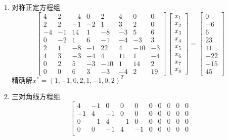 \documentclass[a4paper,11pt]{article}
\begin{document}
\begin{enumerate}
\begin{displaymath}
\begin{array}{c}
		\end{array}
		\right]
	\end{displaymath}
	精确解$x^{*}=\left(1,-1,0,1,2,0,3,1,-1,2\right)^T$
	\item 对称正定方程组
	\begin{displaymath} %
		\left[
		\begin{array}{cccccccc}
			4 & 2 & -4 & 0 & 2 & 4 & 0 & 0\\
    		2 & 2 & -1 & -2 & 1 & 3 & 2 & 0\\
		    -4 & -1 & 14 & 1 & -8 & -3 & 5 & 6\\
		    0 & -2 & 1 & 6 & -1 & -4 & -3 & 3\\
		    2 & 1 & -8 & -1 & 22 & 4 & -10 & -3\\
		    4 & 3 & -3 & -4 & 4 & 11 & 1 & -4\\
		    0 & 2 & 5 & -3 & -10 & 1 & 14 & 2\\
		    0 & 0 & 6 & 3 & -3 & -4 & 2 & 19
		\end{array}
		\right]
		\left[
		\begin{array}{c}
			x_1\\x_2\\x_3\\x_4\\x_5\\x_6\\x_7\\x_8
		\end{array}
		\right]
		=
		\left[
		\begin{array}{c}
			0 \\ -6 \\ 6 \\ 23 \\ 11 \\ -22 \\ -15 \\ 45
		\end{array}
		\right]
	\end{displaymath}
	精确解$x^{*}=\left(1,-1,0,2,1,-1,0,2\right)^T$
	\item 三对角线方程组
	\begin{displaymath} %
		\left[
		\begin{array}{cccccccccc}
			4 & -1 & 0 & 0 & 0 & 0 & 0 & 0 & 0 & 0\\
		    -1 & 4 & -1 & 0 & 0 & 0 & 0 & 0 & 0 & 0\\
		    0 & -1 & 4 & -1 & 0 & 0 & 0 & 0 & 0 & 0\\
		    0 & 0 & -1 & 4 & -1 & 0 & 0 & 0 & 0 & 0\\

\end{array}
\end{displaymath}
\end{enumerate}
\end{document}
